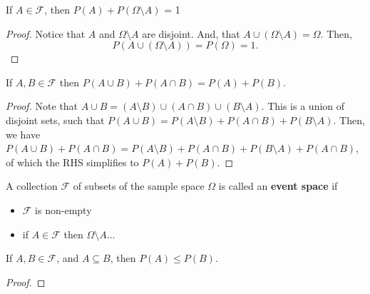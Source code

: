 
\begin{theorem}
	If \( A \in \mathcal{F} \), then \( P(A) + P(\Omega \setminus A) \) = 1
\end{theorem}
\begin{proof}
	Notice that \( A \) and \( \Omega  \setminus  A \) are disjoint. And, that \( A \cup (\Omega  \setminus A) = \Omega \). Then,	\[
		P(A \cup (\Omega \setminus A)) = P(\Omega ) = 1
	.\] 
\end{proof}

\begin{theorem}
	If \( A,B \in \mathcal{F} \) then \( P(A \cup B) + P(A \cap B) = P(A) + P(B)\).
\end{theorem}
\begin{proof}
	Note that \( A \cup B = (A \setminus B) \cup (A \cap B) \cup (B \setminus A) \). This is a union of disjoint sets, such that \( P(A \cup B) = P(A \setminus B) + P(A \cap B) + P(B \setminus A) \). Then, we have \( P(A \cup B) + P(A \cap B) = P(A \setminus B) + P(A \cap B) + P(B \setminus A) + P(A \cap B)\), of which the RHS simplifies to \( P(A) + P(B) \).
\end{proof}

\begin{definition}
	A collection \( \mathcal{F} \) of subsets of the sample space \( \Omega  \) is called an \textbf{event space} if 
	\begin{itemize}
		\item \( \mathcal{F} \) is non-empty
		\item if \( A \in \mathcal{F} \) then \( \Omega \setminus A \)...
	\end{itemize}
\end{definition}

\begin{theorem}
	If \( A, B \in \mathcal{F} \), and \( A \subseteq B \), then \( P(A) \le  P(B) \).
\end{theorem}
\begin{proof}
	
\end{proof}
